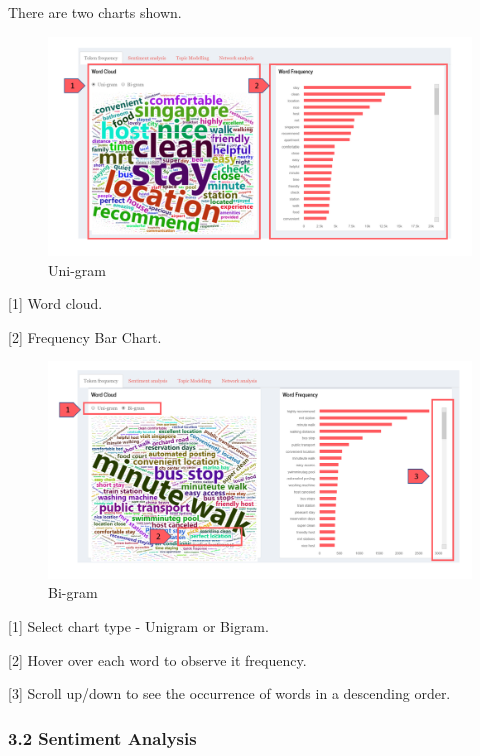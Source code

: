 \documentclass[
  12pt,
]{article}
\begin{document}
There are two charts shown.

\begin{figure}[H]

{\centering \includegraphics[width=0.95\linewidth]{images/wordcloud} 

}

\caption{Uni-gram}\label{fig:unnamed-chunk-11}
\end{figure}

{[}1{]} Word cloud.

{[}2{]} Frequency Bar Chart.

\begin{figure}[H]

{\centering \includegraphics[width=0.95\linewidth]{images/wordcloud2} 

}

\caption{Bi-gram}\label{fig:unnamed-chunk-12}
\end{figure}

{[}1{]} Select chart type - Unigram or Bigram.

{[}2{]} Hover over each word to observe it frequency.

{[}3{]} Scroll up/down to see the occurrence of words in a descending
order.

\hypertarget{sentiment-analysis}{%
\subsubsection{3.2 Sentiment Analysis}\label{sentiment-analysis}}
\end{document}

